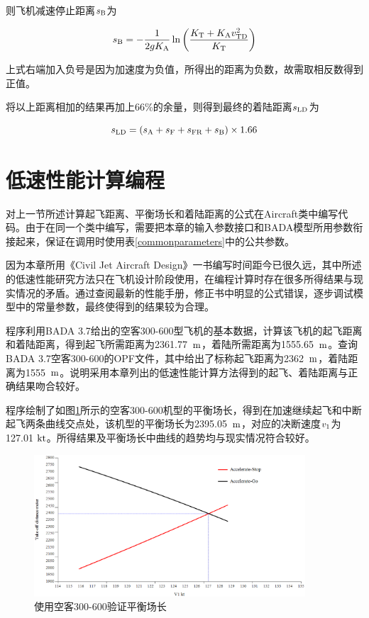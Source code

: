 \documentclass[a4paper,punct,space,heading=true,AutoFakeBold]{ctexrep}
\begin{document}
则飞机减速停止距离$s_{\rm B}$为

\begin{equation}
s_{\rm B}=-\frac{1}{2gK_{\rm A}}\ln\left(\frac{K_{\rm T}+K_{\rm A}v_{\rm TD}^2}{K_{\rm T}}\right)
\end{equation}

上式右端加入负号是因为加速度为负值，所得出的距离为负数，故需取相反数得到正值。

将以上距离相加的结果再加上66\%的余量，则得到最终的着陆距离$s_{\rm LD}$为

\begin{equation}
s_{\rm LD}=\left(s_{\rm A}+s_{\rm F}+s_{\rm FR}+s_{\rm B}\right)\times 1.66
\end{equation}



\section{低速性能计算编程}

对上一节所述计算起飞距离、平衡场长和着陆距离的公式在Aircraft类中编写代码。由于在同一个类中编写，需要把本章的输入参数接口和BADA模型所用参数衔接起来，保证在调用时使用表\ref{commonparameters}中的公共参数。

因为本章所用《Civil Jet Aircraft Design》一书编写时间距今已很久远，其中所述的低速性能研究方法只在飞机设计阶段使用，在编程计算时存在很多所得结果与现实情况的矛盾。通过查阅最新的性能手册，修正书中明显的公式错误，逐步调试模型中的常量参数，最终使得到的结果较为合理。

程序利用BADA 3.7给出的空客300-600型飞机的基本数据，计算该飞机的起飞距离和着陆距离，得到起飞所需距离为2361.77\ $\rm m$，着陆所需距离为1555.65\ $\rm m$。查询BADA 3.7空客300-600的OPF文件，其中给出了标称起飞距离为2362\ $\rm m$，着陆距离为1555\ $\rm m$。说明采用本章列出的低速性能计算方法得到的起飞、着陆距离与正确结果吻合较好。

程序绘制了如图\ref{verifybfl}所示的空客300-600机型的平衡场长，得到在加速继续起飞和中断起飞两条曲线交点处，该机型的平衡场长为2395.05\ $\rm m$，对应的决断速度$v_{\rm 1}$为127.01 $\rm kt$。所得结果及平衡场长中曲线的趋势均与现实情况符合较好。

\begin{figure}[h]
	\centering
	\includegraphics[width=0.9\textwidth]{pic/verifybfl.eps}\hspace{30pt}
	\caption{使用空客300-600验证平衡场长}\label{verifybfl}
\end{figure}
\end{document}

